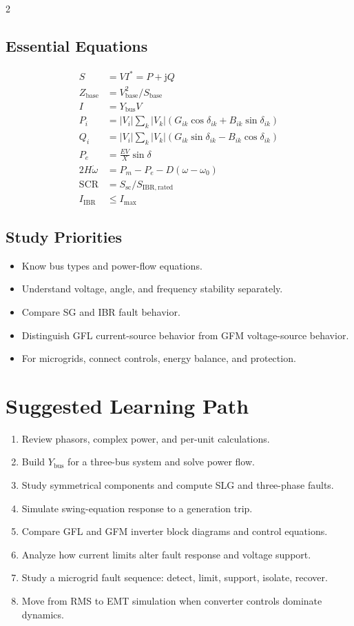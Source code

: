 \documentclass[11pt]{article}
\newcommand{\junit}{\mathrm{j}}
\begin{document}
\begin{multicols}{2}
\subsection*{Essential Equations}
\begin{align*}
S &= VI^* = P+\junit Q\\
Z_{\mathrm{base}} &= V_{\mathrm{base}}^2/S_{\mathrm{base}}\\
I &= Y_{\mathrm{bus}}V\\
P_i &= |V_i|\sum_k |V_k|(G_{ik}\cos\delta_{ik}+B_{ik}\sin\delta_{ik})\\
Q_i &= |V_i|\sum_k |V_k|(G_{ik}\sin\delta_{ik}-B_{ik}\cos\delta_{ik})\\
P_e &= \frac{EV}{X}\sin\delta\\
2H\dot{\omega} &= P_m-P_e-D(\omega-\omega_0)\\
\mathrm{SCR} &= S_{\mathrm{sc}}/S_{\mathrm{IBR,rated}}\\
I_{\mathrm{IBR}} &\le I_{\max}
\end{align*}

\subsection*{Study Priorities}
\begin{itemize}[leftmargin=*]
  \item Know bus types and power-flow equations.
  \item Understand voltage, angle, and frequency stability separately.
  \item Compare SG and IBR fault behavior.
  \item Distinguish GFL current-source behavior from GFM voltage-source behavior.
  \item For microgrids, connect controls, energy balance, and protection.
\end{itemize}
\end{multicols}

\section{Suggested Learning Path}
\begin{enumerate}
  \item Review phasors, complex power, and per-unit calculations.
  \item Build $Y_{\mathrm{bus}}$ for a three-bus system and solve power flow.
  \item Study symmetrical components and compute SLG and three-phase faults.
  \item Simulate swing-equation response to a generation trip.
  \item Compare GFL and GFM inverter block diagrams and control equations.
  \item Analyze how current limits alter fault response and voltage support.
  \item Study a microgrid fault sequence: detect, limit, support, isolate, recover.
  \item Move from RMS to EMT simulation when converter controls dominate dynamics.
\end{enumerate}
\end{document}
